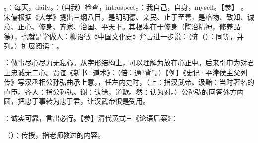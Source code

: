 {
\item {}。：每天，daily。：（自我）检查，introspect。：我自己，自身，myself。【参】 。宋儒根据《大学》提出三纲八目，是明明德、亲民、止于至善，是格物、致知、诚意、正心、修身、齐家、治国、平天下。其根本在于修身（陶冶精神，修养品德），也就是学做人：柳诒徵《中国文化史》弁言进一步说：（侪（）：同等，并列。）扩展阅读：。%


\item {}：做事尽心尽力无私心。从字形结构上，可以理解为放在心正中。后来引申为对君上忠诚无二心。贾谊《新书·道术》：（倍：通“背”。）【例】《史记·平津侯主父列传》写汉丞相公孙弘曲承上意，，任左内史时，（上：指汉武帝。汲黯：当时著名的直臣。齐人：指公孙弘。谢：认错，道歉。然：认为对。）公孙弘的回答外方内圆，把忠于事转为忠于君，让汉武帝很是受用。

：诚实可靠，言出必行。【参】清代黄式三《论语后案》：

\item {}（）：传授，指老师教过的内容。
}
{}


